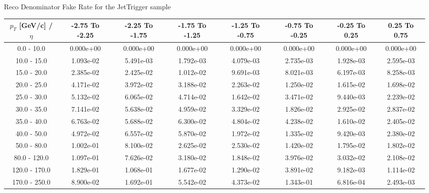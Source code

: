 \large 
Reco Denominator Fake Rate for the JetTrigger sample
\footnotesize 
\begin{tabular*}{\textwidth}{|c|c|c|c|c|c|c|c|}\hline 
$p_T$ [GeV/c] / $\eta$  & -2.75 To -2.25 & -2.25 To -1.75 & -1.75 To -1.25 & -1.25 To -0.75 & -0.75 To -0.25 & -0.25 To 0.25 & 0.25 To 0.75 \\ 
 \hline 
0.0 - 10.0 & 0.000e+00 & 0.000e+00 & 0.000e+00 & 0.000e+00 & 0.000e+00 & 0.000e+00 & 0.000e+00 \\ 
10.0 - 15.0 & 1.093e-02 & 5.491e-03 & 1.792e-03 & 4.079e-03 & 2.735e-03 & 1.928e-03 & 2.595e-03 \\ 
15.0 - 20.0 & 2.385e-02 & 2.425e-02 & 1.012e-02 & 9.691e-03 & 8.021e-03 & 6.197e-03 & 8.258e-03 \\ 
20.0 - 25.0 & 4.171e-02 & 3.972e-02 & 3.188e-02 & 2.263e-02 & 1.250e-02 & 1.615e-02 & 1.698e-02 \\ 
25.0 - 30.0 & 5.132e-02 & 6.065e-02 & 4.714e-02 & 1.642e-02 & 3.471e-02 & 9.440e-03 & 2.239e-02 \\ 
30.0 - 35.0 & 7.141e-02 & 5.638e-02 & 4.959e-02 & 3.329e-02 & 1.826e-02 & 2.925e-02 & 2.837e-02 \\ 
35.0 - 40.0 & 6.763e-02 & 5.688e-02 & 6.300e-02 & 4.804e-02 & 4.238e-02 & 1.610e-02 & 2.405e-02 \\ 
40.0 - 50.0 & 4.972e-02 & 6.557e-02 & 5.870e-02 & 1.972e-02 & 1.335e-02 & 9.420e-03 & 2.380e-02 \\ 
50.0 - 80.0 & 1.002e-01 & 8.100e-02 & 2.625e-02 & 2.530e-02 & 1.420e-02 & 1.795e-02 & 1.802e-02 \\ 
80.0 - 120.0 & 1.097e-01 & 7.626e-02 & 3.180e-02 & 1.848e-02 & 3.976e-02 & 3.032e-02 & 2.108e-02 \\ 
120.0 - 170.0 & 1.829e-01 & 1.068e-01 & 1.677e-02 & 1.290e-02 & 3.891e-02 & 9.182e-03 & 1.114e-02 \\ 
170.0 - 250.0 & 8.900e-02 & 1.692e-01 & 5.542e-02 & 4.373e-02 & 1.343e-01 & 6.816e-04 & 2.493e-03 \\ 
 \hline 
\end{tabular*} 
